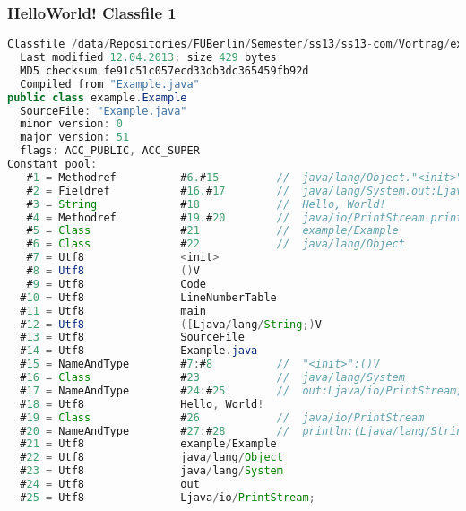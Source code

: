 \documentclass[10pt]{beamer}
\begin{document}
\begin{frame}[fragile]
\frametitle{HelloWorld! Classfile 1}
\begin{lstlisting}[language=Java,basicstyle=\ttfamily\tiny]
Classfile /data/Repositories/FUBerlin/Semester/ss13/ss13-com/Vortrag/example/Example.class
  Last modified 12.04.2013; size 429 bytes
  MD5 checksum fe91c51c057ecd33db3dc365459fb92d
  Compiled from "Example.java"
public class example.Example
  SourceFile: "Example.java"
  minor version: 0
  major version: 51
  flags: ACC_PUBLIC, ACC_SUPER
Constant pool:
   #1 = Methodref          #6.#15         //  java/lang/Object."<init>":()V
   #2 = Fieldref           #16.#17        //  java/lang/System.out:Ljava/io/PrintStream;
   #3 = String             #18            //  Hello, World!
   #4 = Methodref          #19.#20        //  java/io/PrintStream.println:(Ljava/lang/String;)V
   #5 = Class              #21            //  example/Example
   #6 = Class              #22            //  java/lang/Object
   #7 = Utf8               <init>
   #8 = Utf8               ()V
   #9 = Utf8               Code
  #10 = Utf8               LineNumberTable
  #11 = Utf8               main
  #12 = Utf8               ([Ljava/lang/String;)V
  #13 = Utf8               SourceFile
  #14 = Utf8               Example.java
  #15 = NameAndType        #7:#8          //  "<init>":()V
  #16 = Class              #23            //  java/lang/System
  #17 = NameAndType        #24:#25        //  out:Ljava/io/PrintStream;
  #18 = Utf8               Hello, World!
  #19 = Class              #26            //  java/io/PrintStream
  #20 = NameAndType        #27:#28        //  println:(Ljava/lang/String;)V
  #21 = Utf8               example/Example
  #22 = Utf8               java/lang/Object
  #23 = Utf8               java/lang/System
  #24 = Utf8               out
  #25 = Utf8               Ljava/io/PrintStream;
\end{lstlisting}
\end{frame}

\end{document}
